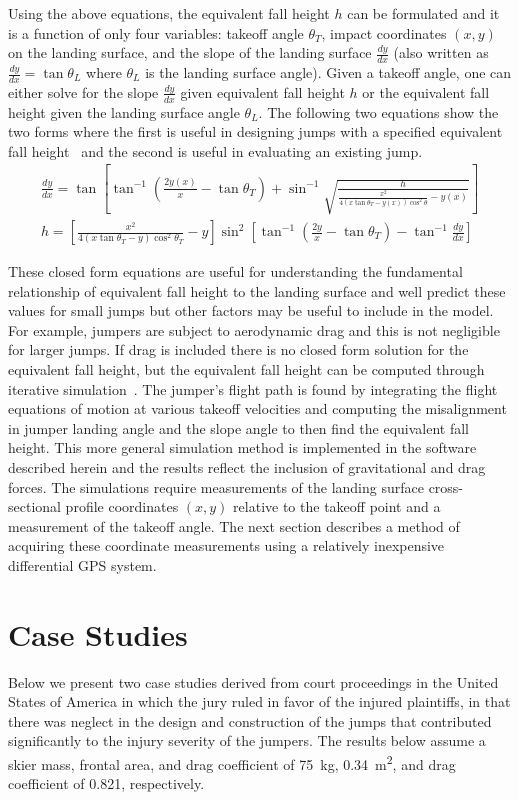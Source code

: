 \documentclass{article}
\begin{document}
Using the above equations, the equivalent fall height $h$ can be formulated and
it is a function of only four variables: takeoff angle $\theta_T$, impact
coordinates $(x, y)$ on the landing surface, and the slope of the landing
surface $\frac{dy}{dx}$ (also written as $\frac{dy}{dx}=\tan\theta_L$ where
$\theta_L$ is the landing surface angle). Given a takeoff angle, one can either
solve for the slope $\frac{dy}{dx}$ given equivalent fall height $h$ or the
equivalent fall height given the landing surface angle $\theta_L$. The
following two equations show the two forms where the first is useful in
designing jumps with a specified equivalent fall height~\cite{Levy2015} and the
second is useful in evaluating an existing jump.
%
\begin{align}
  \frac{dy}{dx} = \tan\left[\tan^{-1}\left(\frac{2y(x)}{x} - \tan\theta_T\right) +
    \sin^{-1}\sqrt{\frac{h}{\frac{x^2}{4(x\tan\theta_T -
    y(x))\cos^{2}\theta} - y(x)}}\right] \\
  h = \left[\frac{x^2}{4(x\tan\theta_T - y)\cos^{2}\theta_T} -
    y\right]\sin^{2}\left[\tan^{-1}\left(\frac{2y}{x}- \tan\theta_T\right) - \tan^{-1}\frac{dy}{dx}\right]
  \label{eq:efh}
\end{align}

These closed form equations are useful for understanding the fundamental
relationship of equivalent fall height to the landing surface and well predict
these values for small jumps but other factors may be useful to include in the
model. For example, jumpers are subject to aerodynamic drag and this is not
negligible for larger jumps. If drag is included there is no closed form
solution for the equivalent fall height, but the equivalent fall height can be
computed through iterative simulation~\cite{Levy2015}. The jumper's flight path
is found by integrating the flight equations of motion at various takeoff
velocities and computing the misalignment in jumper landing angle and the slope
angle to then find the equivalent fall height. This more general simulation
method is implemented in the software described herein and the results reflect
the inclusion of gravitational and drag forces. The simulations require
measurements of the landing surface cross-sectional profile coordinates $(x,y)$
relative to the takeoff point and a measurement of the takeoff angle. The next
section describes a method of acquiring these coordinate measurements using a
relatively inexpensive differential GPS system.

\section{Case Studies}
%
Below we present two case studies derived from court proceedings in the United
States of America in which the jury ruled in favor of the injured plaintiffs,
in that there was neglect in the design and construction of the jumps that
contributed significantly to the injury severity of the jumpers. The results
below assume a skier mass, frontal area, and drag coefficient of 75~\si{\kg},
0.34~\si{\meter\squared}, and drag coefficient of 0.821, respectively.
\end{document}
